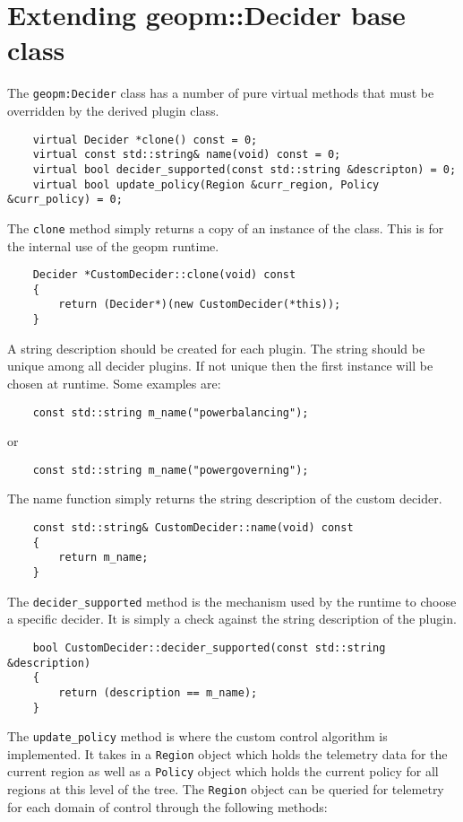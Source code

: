 \documentclass[11pt]{article}
\begin{document}
\section{Extending geopm::Decider base class}
The \verb#geopm:Decider# class has a number of pure virtual methods
that must be overridden by the derived plugin class.
\begin{verbatim}
    virtual Decider *clone() const = 0;
    virtual const std::string& name(void) const = 0;
    virtual bool decider_supported(const std::string &descripton) = 0;
    virtual bool update_policy(Region &curr_region, Policy &curr_policy) = 0;
\end{verbatim}
The \verb#clone# method simply returns a copy of an instance of the
class. This is for the internal use of the geopm runtime.
\begin{verbatim}
    Decider *CustomDecider::clone(void) const
    {
        return (Decider*)(new CustomDecider(*this));
    }
\end{verbatim}
A string description should be created for each plugin. The string
should be unique among all decider plugins. If not unique then the
first instance will be chosen at runtime. Some examples are:
\begin{verbatim}
    const std::string m_name("powerbalancing");
\end{verbatim}
or
\begin{verbatim}
    const std::string m_name("powergoverning");
\end{verbatim}
The name function simply returns the string description of the custom
decider.
\begin{verbatim}
    const std::string& CustomDecider::name(void) const
    {
        return m_name;
    }
\end{verbatim}
The \verb#decider_supported# method is the mechanism used by the
runtime to choose a specific decider. It is simply a check against the
string description of the plugin.
\begin{verbatim}
    bool CustomDecider::decider_supported(const std::string &description)
    {
        return (description == m_name);
    }
\end{verbatim}
The \verb#update_policy# method is where the custom control algorithm
is implemented. It takes in a \verb#Region# object which holds the
telemetry data for the current region as well as a \verb#Policy#
object which holds the current policy for all regions at this level of
the tree. The \verb#Region# object can be queried for telemetry for
each domain of control through the following methods:
\end{document}
